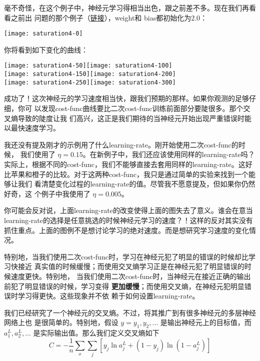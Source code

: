 毫不奇怪，在这个例子中，神经元学习得相当出色，跟之前差不多。现在我们再看看之前出
问题的那个例子（\hyperref[saturation2_anchor]{链接}），\gls*{weight}和%
\gls*{bias}都初始化为$2.0$：
\begin{center}
  \texttt{[image: saturation4-0]}
\end{center}
你将看到如下变化的曲线：
\begin{center}
  \texttt{[image: saturation4-50]}\texttt{[image: saturation4-100]}\\
  \texttt{[image: saturation4-150]}\texttt{[image: saturation4-200]}\\
  \texttt{[image: saturation4-250]}\texttt{[image: saturation4-300]}
\end{center}

成功了！这次神经元的学习速度相当快，跟我们预期的那样。如果你观测的足够仔细，你可
以发现\gls*{cost-func}曲线要比二次\gls*{cost-func}训练前面部分要陡很多。那个交叉熵导致的陡度让我
们高兴，这正是我们期待的当神经元开始出现严重错误时能以最快速度学习。

我还没有提及刚才的示例用了什么\gls*{learning-rate}。刚开始使用二次\gls*{cost-func}的时候，
我们使用了 $\eta = 0.15$。在新例子中，我们还应该使用同样的\gls*{learning-rate}吗？
实际上，根据不同的\gls*{cost-func}，我们不能够直接去套用同样的\gls*{learning-rate}。这好
比苹果和橙子的比较。对于这两种\gls*{cost-func}，我只是通过简单的实验来找到一个能够让我们
看清楚变化过程的\gls*{learning-rate}的值。尽管我不愿意提及，但如果你仍然好奇，这
个例子中我使用了 $\eta = 0.005$。

你可能会反对说，上面\gls*{learning-rate}的改变使得上面的图失去了意义。谁会在意当%
\gls*{learning-rate}的选择是任意挑选的时候神经元学习的速度？！这样的反对其实没有
抓住重点。上面的图例不是想讨论学习的绝对速度。而是想研究学习速度的变化情况。

特别地，当我们使用二次\gls*{cost-func}时，学习在神经元犯了明显的错误的时候却比学习快接近
真实值的时候缓慢；而使用交叉熵学习正是在神经元犯了明显错误的时候速度更快。特别地，
当我们使用二次\gls*{cost-func}时，当神经元在接近正确的输出前犯了明显错误的时候，学习变得%
\textbf{更加缓慢}；而使用交叉熵，在神经元犯明显错误时学习得更快。这些现象并不依
赖于如何设置\gls*{learning-rate}。

我们已经研究了一个神经元的交叉熵。不过，将其推广到有很多神经元的多层神经网络上也
是很简单的。特别地，假设 $y = y_1, y_2, \ldots$ 是输出神经元上的目标值，而
$a^L_1, a^L_2, \ldots$ 是实际输出值。那么我们定义交叉熵如下
\begin{equation}
  C = -\frac{1}{n} \sum_x \sum_j \left[y_j \ln a^L_j + (1-y_j) \ln (1-a^L_j) \right]
  \label{eq:63}\tag{63}
\end{equation}

